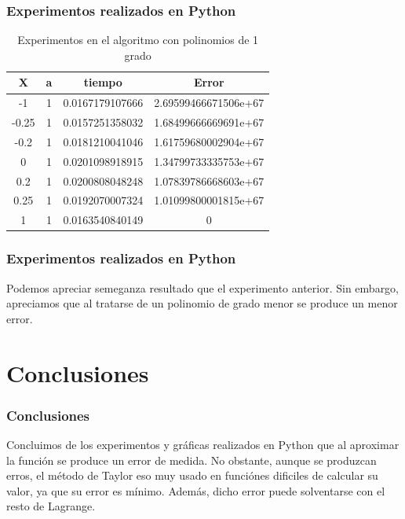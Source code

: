 \documentclass{beamer}
\begin{document}
\begin{frame}
\frametitle{Experimentos realizados en \textsf{Python}}
\begin{table}{}
 \begin{center}
  \begin{tabular}{|c|c|c|c|}
   \hline
   X     &a& tiempo            & Error \\ \hline
   -1    &1&0.0167179107666    & 2.69599466671506e+67  \\ \hline
   -0.25 &1&0.0157251358032    & 1.68499666669691e+67  \\ \hline
   -0.2  &1&0.0181210041046    & 1.61759680002904e+67  \\ \hline     
   0     &1&0.0201098918915    & 1.34799733335753e+67  \\ \hline
   0.2   &1&0.0200808048248    & 1.07839786668603e+67  \\ \hline
   0.25  &1&0.0192070007324    & 1.01099800001815e+67  \\ \hline
   1     &1&0.0163540840149    & 0 \\ \hline
\end{tabular}
\end{center}
\caption{Experimentos en el algoritmo con polinomios de 1 grado}
\label{tab}
\end{table}
\end{frame}

\begin{frame}
\frametitle{Experimentos realizados en \textsf{Python}}
Podemos apreciar semeganza resultado que el experimento anterior. Sin embargo, apreciamos que al tratarse de un polinomio de grado menor se produce un menor error.
\end{frame}

\section{Conclusiones}
\begin{frame}
\frametitle{Conclusiones}
\begin{block}{}
Concluimos de los experimentos y gráficas realizados en \textsf{Python} que al aproximar la función se produce un error de medida.
No obstante, aunque se produzcan erros, el método de Taylor eso muy usado en funciónes dificiles de calcular su valor, ya que su error es mínimo.
Además, dicho error puede solventarse con el resto de Lagrange.
\end{block}
\end{frame}
\end{document}
